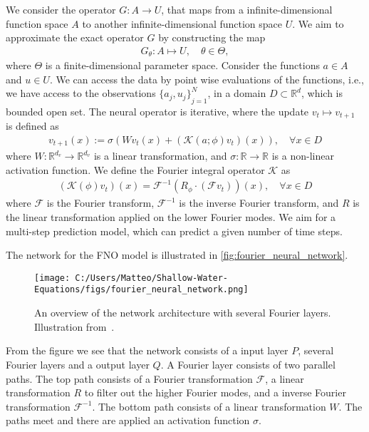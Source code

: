 We consider the operator $G: A \to U$, that maps from a infinite-dimensional function space $A$ to another infinite-dimensional function space $U$.
We aim to approximate the exact operator $G$ by constructing the map
\begin{align*}
    G_{\theta}: A \mapsto U, \quad \theta \in \Theta,
\end{align*} 
where $\Theta$ is a finite-dimensional parameter space.
Consider the functions $a \in A$ and $u \in U$.
We can access the data by point wise evaluations of the functions, i.e., we have access to the observations ${\{a_j, u_j \}}_{j=1}^N$, in a domain $D \subset \mathbb{R}^d$, which is bounded open set.
The neural operator is iterative, where the update $v_t \mapsto v_{t+1}$ is defined as
\begin{align}
    v_{t+1}(x) := \sigma \left( W v_t(x) + \left( \mathcal{K}(a;\phi)v_t \right) (x) \right), \quad \forall x \in D
\end{align}
where $W: \mathbb{R}^{d_v} \to \mathbb{R}^{d_v}$ is a linear transformation, and $\sigma: \mathbb{R} \to \mathbb{R}$ is a non-linear activation function.
We define the Fourier integral operator $\mathcal{K}$ as 
\begin{align}
    \left( \mathcal{K}(\phi)v_t \right) (x) = \mathcal{F}^{-1} \left( R_{\phi} \cdot (\mathcal{F}v_t ) \right)(x), \quad \forall x \in D
\end{align}
where $\mathcal{F}$ is the Fourier transform, $\mathcal{F}^{-1}$ is the inverse Fourier transform, and $R$ is the linear transformation applied on the lower Fourier modes. 
We aim for a multi-step prediction model, which can predict a given number of time steps.

The network for the FNO model is illustrated in \autoref{fig:fourier_neural_network}.
\begin{figure}[H]
    \centering
    \texttt{[image: C:/Users/Matteo/Shallow-Water-Equations/figs/fourier\_neural\_network.png]}
    \caption{An overview of the network architecture with several Fourier layers. Illustration from~\cite{FNO_2021}.}\label{fig:fourier_neural_network}
\end{figure}
From the figure we see that the network consists of a input layer $P$, several Fourier layers and a output layer $Q$.
A Fourier layer consists of two parallel paths. The top path consists of a Fourier transformation $\mathcal{F}$, a linear transformation $R$ to filter out the higher Fourier modes, and a inverse Fourier transformation $\mathcal{F}^{-1}$.
The bottom path consists of a linear transformation $W$. 
The paths meet and there are applied an activation function $\sigma$.



